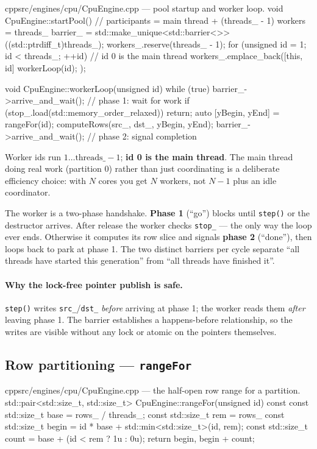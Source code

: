 \documentclass[
	english,
	letterpaper, oneside
]{article}
\begin{document}
\begin{sourcecode}{cpp}{src/engines/cpu/CpuEngine.cpp --- pool startup and worker loop.}
void CpuEngine::startPool() {
  // participants = main thread + (threads_ - 1) workers = threads_
  barrier_ = std::make_unique<std::barrier<>>((std::ptrdiff_t)threads_);
  workers_.reserve(threads_ - 1);
  for (unsigned id = 1; id < threads_; ++id)        // id 0 is the main thread
    workers_.emplace_back([this, id] { workerLoop(id); });
}

void CpuEngine::workerLoop(unsigned id) {
  while (true) {
    barrier_->arrive_and_wait();                     // phase 1: wait for work
    if (stop_.load(std::memory_order_relaxed)) return;
    auto [yBegin, yEnd] = rangeFor(id);
    computeRows(src_, dst_, yBegin, yEnd);
    barrier_->arrive_and_wait();                     // phase 2: signal completion
  }
}
\end{sourcecode}

Worker ids run $1\ldots\text{threads\_}-1$; \textbf{id 0 is the main thread}. The
main thread doing real work (partition 0) rather than just coordinating is a
deliberate efficiency choice: with $N$ cores you get $N$ workers, not $N-1$ plus
an idle coordinator.

The worker is a two-phase handshake. \textbf{Phase 1} (``go'') blocks until
\texttt{step()} or the destructor arrives. After release the worker checks
\texttt{stop\_} --- the only way the loop ever ends. Otherwise it computes its row
slice and signals \textbf{phase 2} (``done''), then loops back to park at phase 1.
The two distinct barriers per cycle separate ``all threads have started this
generation'' from ``all threads have finished it''.

\paragraph{Why the lock-free pointer publish is safe.} \texttt{step()} writes
\texttt{src\_}/\texttt{dst\_} \emph{before} arriving at phase 1; the worker reads
them \emph{after} leaving phase 1. The barrier establishes a happens-before
relationship, so the writes are visible without any lock or atomic on the
pointers themselves.

\subsection{Row partitioning --- \texttt{rangeFor}}

\begin{sourcecode}{cpp}{src/engines/cpu/CpuEngine.cpp --- the half-open row range for a partition.}
std::pair<std::size_t, std::size_t> CpuEngine::rangeFor(unsigned id) const {
  const std::size_t base = rows_ / threads_;
  const std::size_t rem  = rows_ %
  const std::size_t begin = id * base + std::min<std::size_t>(id, rem);
  const std::size_t count = base + (id < rem ? 1u : 0u);
  return {begin, begin + count};
}
\end{sourcecode}
\end{document}

